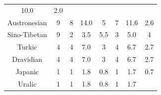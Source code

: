 \begin{center}
{\begin{tabular}{|c|c|c|c|c|c|c|c|}
10.0& 
	

2.0\\ 

Austronesian &
	

9& 
	

8& 
	

14.0& 
	

5& 
	

7& 
	

11.6& 
	

2.6\\ 

Sino-Tibetan &
	

9& 
	

2& 
	

3.5& 
	

5.5& 
	

3& 
	

5.0& 
	

4\\ 

Turkic &
	

4& 
	

4& 
	

7.0& 
	

3& 
	

4& 
	

6.7& 
	

2.7\\ 

Dravidian &
	

4& 
	

4& 
	

7.0& 
	

3& 
	

4& 
	

6.7& 
	

2.7\\ 

Japanic &
	

1& 
	

1& 
	

1.8& 
	

0.8& 
	

1& 
	

1.7& 
	

0.7\\ 

Uralic &
	

1& 
	

1& 
	

1.8& 
	

0.8& 
	

1& 
	

1.7& 
	


\end{tabular}}
\end{center}
